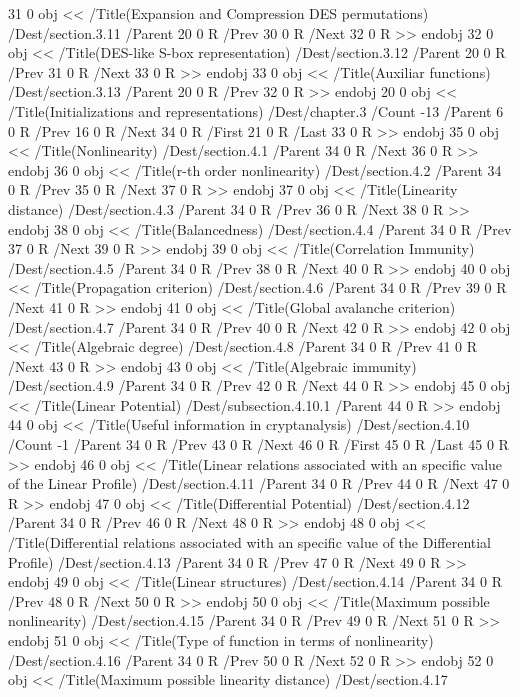 {{{{{{{{{{{{{{{{{{{{{{{{{{{{31 0 obj
<< /Title(Expansion and Compression DES permutations)
/Dest/section.3.11
/Parent 20 0 R
/Prev 30 0 R
/Next 32 0 R
>>
endobj
32 0 obj
<< /Title(DES-like S-box representation)
/Dest/section.3.12
/Parent 20 0 R
/Prev 31 0 R
/Next 33 0 R
>>
endobj
33 0 obj
<< /Title(Auxiliar functions)
/Dest/section.3.13
/Parent 20 0 R
/Prev 32 0 R
>>
endobj
20 0 obj
<< /Title(Initializations and representations)
/Dest/chapter.3
/Count -13 /Parent 6 0 R
/Prev 16 0 R
/Next 34 0 R
/First 21 0 R /Last 33 0 R
>>
endobj
35 0 obj
<< /Title(Nonlinearity)
/Dest/section.4.1
/Parent 34 0 R
/Next 36 0 R
>>
endobj
36 0 obj
<< /Title(r-th order nonlinearity)
/Dest/section.4.2
/Parent 34 0 R
/Prev 35 0 R
/Next 37 0 R
>>
endobj
37 0 obj
<< /Title(Linearity distance)
/Dest/section.4.3
/Parent 34 0 R
/Prev 36 0 R
/Next 38 0 R
>>
endobj
38 0 obj
<< /Title(Balancedness)
/Dest/section.4.4
/Parent 34 0 R
/Prev 37 0 R
/Next 39 0 R
>>
endobj
39 0 obj
<< /Title(Correlation Immunity)
/Dest/section.4.5
/Parent 34 0 R
/Prev 38 0 R
/Next 40 0 R
>>
endobj
40 0 obj
<< /Title(Propagation criterion)
/Dest/section.4.6
/Parent 34 0 R
/Prev 39 0 R
/Next 41 0 R
>>
endobj
41 0 obj
<< /Title(Global avalanche criterion)
/Dest/section.4.7
/Parent 34 0 R
/Prev 40 0 R
/Next 42 0 R
>>
endobj
42 0 obj
<< /Title(Algebraic degree)
/Dest/section.4.8
/Parent 34 0 R
/Prev 41 0 R
/Next 43 0 R
>>
endobj
43 0 obj
<< /Title(Algebraic immunity)
/Dest/section.4.9
/Parent 34 0 R
/Prev 42 0 R
/Next 44 0 R
>>
endobj
45 0 obj
<< /Title(Linear Potential)
/Dest/subsection.4.10.1
/Parent 44 0 R
>>
endobj
44 0 obj
<< /Title(Useful information in cryptanalysis)
/Dest/section.4.10
/Count -1 /Parent 34 0 R
/Prev 43 0 R
/Next 46 0 R
/First 45 0 R /Last 45 0 R
>>
endobj
46 0 obj
<< /Title(Linear relations associated with an specific value of the Linear Profile)
/Dest/section.4.11
/Parent 34 0 R
/Prev 44 0 R
/Next 47 0 R
>>
endobj
47 0 obj
<< /Title(Differential Potential)
/Dest/section.4.12
/Parent 34 0 R
/Prev 46 0 R
/Next 48 0 R
>>
endobj
48 0 obj
<< /Title(Differential relations associated with an specific value of the Differential Profile)
/Dest/section.4.13
/Parent 34 0 R
/Prev 47 0 R
/Next 49 0 R
>>
endobj
49 0 obj
<< /Title(Linear structures)
/Dest/section.4.14
/Parent 34 0 R
/Prev 48 0 R
/Next 50 0 R
>>
endobj
50 0 obj
<< /Title(Maximum possible nonlinearity)
/Dest/section.4.15
/Parent 34 0 R
/Prev 49 0 R
/Next 51 0 R
>>
endobj
51 0 obj
<< /Title(Type of function in terms of nonlinearity)
/Dest/section.4.16
/Parent 34 0 R
/Prev 50 0 R
/Next 52 0 R
>>
endobj
52 0 obj
<< /Title(Maximum possible linearity distance)
/Dest/section.4.17
}}}}}}}}}}}}}}}}}}}}}}}}}}}}
